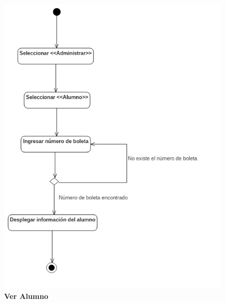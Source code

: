 \begin{figure}[H]
  \centering
    \includegraphics[scale=.8,angle=0]{project/Actividades/vera.jpg}
  \caption{\textbf{Ver Alumno}}
\end{figure}
